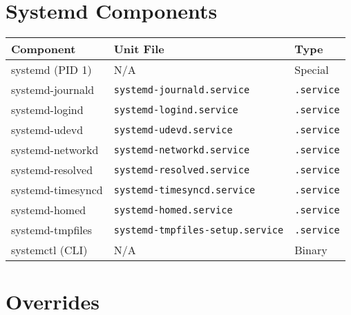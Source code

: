 \documentclass[openany, 12pt]{book}
\begin{document}
\chapter{Systemd Components}

\begin{tabular}{lll}
	\toprule
	\textbf{Component} & \textbf{Unit File}                      & \textbf{Type}     \\
	\midrule
	systemd (PID 1)    & N/A                                     & Special           \\
	systemd-journald   & \texttt{systemd-journald.service}       & \texttt{.service} \\
	systemd-logind     & \texttt{systemd-logind.service}         & \texttt{.service} \\
	systemd-udevd      & \texttt{systemd-udevd.service}          & \texttt{.service} \\
	systemd-networkd   & \texttt{systemd-networkd.service}       & \texttt{.service} \\
	systemd-resolved   & \texttt{systemd-resolved.service}       & \texttt{.service} \\
	systemd-timesyncd  & \texttt{systemd-timesyncd.service}      & \texttt{.service} \\
	systemd-homed      & \texttt{systemd-homed.service}          & \texttt{.service} \\
	systemd-tmpfiles   & \texttt{systemd-tmpfiles-setup.service} & \texttt{.service} \\
	systemctl (CLI)    & N/A                                     & Binary            \\
	\bottomrule
\end{tabular}

\chapter{Overrides}

\end{document}
